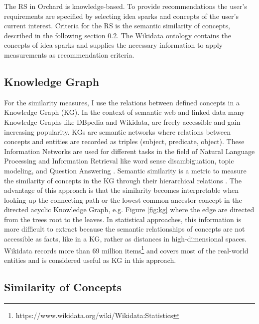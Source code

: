 \documentclass[pdftex,a4paper,12pt]{scrartcl}
\theoremstyle{definition}
\begin{document}

The RS in Orchard is knowledge-based. To provide recommendations the user's requirements are specified by selecting idea sparks and concepts of the user's current interest. Criteria for the RS is the semantic similarity of concepts, described in the following section \ref{similarity}. The Wikidata ontology contains the concepts of idea sparks and supplies the necessary information to apply measurements as recommendation criteria.
\subsection{Knowledge Graph}
    For the similarity measures, I use the relations between defined concepts in a Knowledge Graph (KG). In the context of semantic web and linked data many Knowledge Graphs like DBpedia and Wikidata, are freely accessible and gain increasing popularity. KGs are semantic networks where relations between concepts and entities are recorded as triples (subject, predicate, object). These Information Networks are used for different tasks in the field of Natural Language Processing and Information Retrieval like word sense disambiguation, topic modeling, and Question Answering \citep{nastase_topic-driven_2008}. 
    Semantic similarity is a metric to measure the similarity of concepts in the KG through their hierarchical relations \citep{zhu_computing_2017}. The advantage of this approach is that the similarity becomes interpretable when looking up the connecting path or the lowest common ancestor concept in the directed acyclic Knowledge Graph, e.g. Figure \ref{fig:kg} where the edge are directed from the trees root to the leaves. In statistical approaches, this information is more difficult to extract because the semantic relationships of concepts are not accessible as facts, like in a KG, rather as distances in high-dimensional spaces.
    Wikidata records more than 69 million items\footnote{https://www.wikidata.org/wiki/Wikidata:Statistics} and covers most of the real-world entities and is considered useful as KG in this approach. 

\subsection{Similarity of Concepts}\label{similarity}
\end{document}
